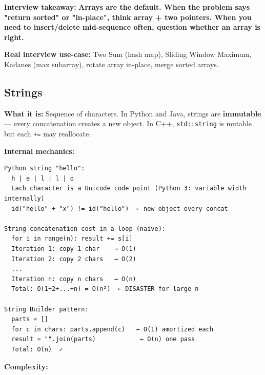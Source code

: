 \documentclass[11pt]{article}
\begin{document}
\textbf{Interview takeaway:} \textbf{Arrays are the default. When the problem says "return sorted" or "in-place", think array + two pointers. When you need to insert/delete mid-sequence often, question whether an array is right.}

\textbf{Real interview use-case:} Two Sum (hash map), Sliding Window Maximum, Kadane\textquotesingle s (max subarray), rotate array in-place, merge sorted arrays.

\subsection{Strings}\label{strings}

\textbf{What it is:} Sequence of characters. In Python and Java, strings are \textbf{immutable} --- every concatenation creates a new object. In C++, \texttt{std::string} is mutable but each \texttt{+=} may reallocate.

\textbf{Internal mechanics:}

\setcodelang{}

\begin{verbatim}
Python string "hello":
  h | e | l | l | o
  Each character is a Unicode code point (Python 3: variable width internally)
  id("hello" + "x") != id("hello")  ← new object every concat

String concatenation cost in a loop (naïve):
  for i in range(n): result += s[i]
  Iteration 1: copy 1 char    → O(1)
  Iteration 2: copy 2 chars   → O(2)
  ...
  Iteration n: copy n chars   → O(n)
  Total: O(1+2+...+n) = O(n²)  ← DISASTER for large n

String Builder pattern:
  parts = []
  for c in chars: parts.append(c)   ← O(1) amortized each
  result = "".join(parts)            ← O(n) one pass
  Total: O(n)  ✓
\end{verbatim}

\textbf{Complexity:}
\end{document}
